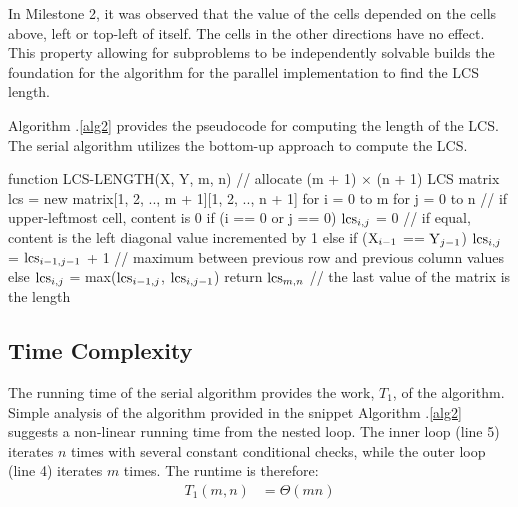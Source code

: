 \documentclass[usletter, 11pt]{extarticle}
\newcommand{\V}[1]{\textup{#1}}
\newcommand{\lcs}{\V{lcs}}
\newcommand{\seqone}{\V{X}}
\newcommand{\seqtwo}{\V{Y}}
\begin{document}
    \vspace{-1in}
    In Milestone 2, it was observed that the value of the cells depended on the
    cells above, left or top-left of itself. The cells in the other directions
    have no effect. This property allowing for subproblems to be independently
    solvable builds the foundation for the algorithm for the parallel
    implementation to find the LCS length.

    Algorithm \thesection .\ref{alg2} provides the pseudocode for
    computing the length of the LCS. The serial algorithm utilizes the bottom-up approach to compute the LCS.

\newpage
\begin{pseudocode}[caption={Serial Longest Common Subsequence Length},
label={alg2}]
function LCS-LENGTH(X, Y, m, n)
    // allocate (m + 1) $\times$ (n + 1) LCS matrix
    lcs = new matrix[1, 2, .., m + 1][1, 2, .., n + 1]
    for i = 0 to m
        for j = 0 to n
            // if upper-leftmost cell, content is 0
            if (i == 0 or j == 0)
                $\lcs_{i, j}$ = 0
            // if equal, content is the left diagonal value incremented by 1
            else if ($\seqone_{i - 1}$ == $\seqtwo_{j - 1}$)
                $\lcs_{i, j}$ = $\lcs_{i-1, j-1}$ + 1  
            // maximum between previous row and previous column values
            else
                $\lcs_{i, j}$ = max($\lcs_{i-1, j}$, $\lcs_{i, j-1}$)
    return $\lcs_{m,n}$  // the last value of the matrix is the length

\end{pseudocode}

        \subsection{Time Complexity} The running time of the serial algorithm
        provides the work, $T_{1}$, of the algorithm. Simple analysis of the
        algorithm provided in the snippet Algorithm \thesection .\ref{alg2}
        suggests a non-linear running time from the nested loop. The inner
        loop (line 5) iterates $n$ times with several constant conditional
        checks, while the outer loop (line 4) iterates $m$ times. The runtime
        is therefore:
        \begin{equation*}
            \begin{split}
                T_1(m, n) & = \Theta(mn) \\
            \end{split}
        \end{equation*}
\end{document}
